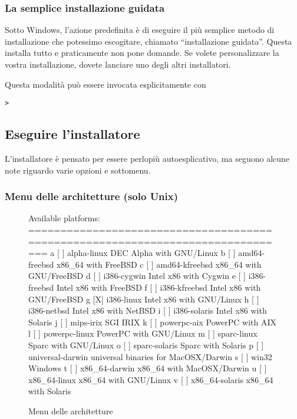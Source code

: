 \documentclass{article}
\begin{document}
\subsubsection{La semplice installazione guidata}

Sotto Windows, l'azione predefinita è di eseguire il più semplice metodo
di installazione che potessimo escogitare, chiamato ``installazione
guidata''. Questa installa tutto e praticamente non pone domande. Se
volete personalizzare la vostra installazione, dovete lanciare uno degli
altri installatori.

Questa modalità può essere invocata esplicitamente con
\begin{alltt}
> 
\end{alltt}


\subsection{Eseguire l'installatore}
\label{sec:runinstall}

L'installatore è pensato per essere perlopiù autoesplicativo, ma seguono
alcune note riguardo varie opzioni e sottomenu.

\subsubsection{Menu delle architetture (solo Unix)}
\label{sec:binary}

\begin{figure}[tb]
\begin{boxedverbatim}
Available platforms:
===============================================================================
   a [ ] alpha-linux      DEC Alpha with GNU/Linux
   b [ ] amd64-freebsd    x86_64 with FreeBSD
   c [ ] amd64-kfreebsd   x86_64 with GNU/FreeBSD
   d [ ] i386-cygwin      Intel x86 with Cygwin
   e [ ] i386-freebsd     Intel x86 with FreeBSD
   f [ ] i386-kfreebsd    Intel x86 with GNU/FreeBSD
   g [X] i386-linux       Intel x86 with GNU/Linux
   h [ ] i386-netbsd      Intel x86 with NetBSD
   i [ ] i386-solaris     Intel x86 with Solaris
   j [ ] mips-irix        SGI IRIX
   k [ ] powerpc-aix      PowerPC with AIX
   l [ ] powerpc-linux    PowerPC with GNU/Linux
   m [ ] sparc-linux      Sparc with GNU/Linux
   o [ ] sparc-solaris    Sparc with Solaris
   p [ ] universal-darwin universal binaries for MacOSX/Darwin
   s [ ] win32            Windows
   t [ ] x86_64-darwin    x86_64 with MacOSX/Darwin
   u [ ] x86_64-linux     x86_64 with GNU/Linux
   v [ ] x86_64-solaris   x86_64 with Solaris
\end{boxedverbatim}
\caption{Menu delle architetture}\label{fig:bin-text}
\end{figure}
\end{document}
